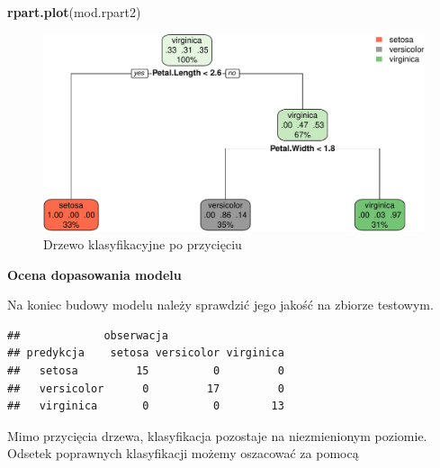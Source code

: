 \documentclass[
]{book}
\newenvironment{Shaded}{\begin{snugshade}}{\end{snugshade}}
\newcommand{\DataTypeTok}[1]{\textcolor[rgb]{0.13,0.29,0.53}{#1}}
\newcommand{\KeywordTok}[1]{\textcolor[rgb]{0.13,0.29,0.53}{\textbf{#1}}}
\newcommand{\NormalTok}[1]{#1}
\newcommand{\OperatorTok}[1]{\textcolor[rgb]{0.81,0.36,0.00}{\textbf{#1}}}
\newcommand{\StringTok}[1]{\textcolor[rgb]{0.31,0.60,0.02}{#1}}
\theoremstyle{plain}
\theoremstyle{definition}
\theoremstyle{definition}
\theoremstyle{definition}
\theoremstyle{definition}
\theoremstyle{remark}
\begin{document}
\begin{Shaded}
\begin{Highlighting}[]
\KeywordTok{rpart.plot}\NormalTok{(mod.rpart2)}
\end{Highlighting}
\end{Shaded}

\begin{figure}
\centering
\includegraphics{EksploracjaDanych_files/figure-latex/unnamed-chunk-18-1.pdf}
\caption{\label{fig:unnamed-chunk-18}Drzewo klasyfikacyjne po przycięciu}
\end{figure}

\textbf{Ocena dopasowania modelu}

Na koniec budowy modelu należy sprawdzić jego jakość na zbiorze testowym.

\begin{Shaded}
\end{Shaded}

\begin{verbatim}
##             obserwacja
## predykcja    setosa versicolor virginica
##   setosa         15          0         0
##   versicolor      0         17         0
##   virginica       0          0        13
\end{verbatim}

Mimo przycięcia drzewa, klasyfikacja pozostaje na niezmienionym poziomie. Odsetek poprawnych klasyfikacji możemy oszacować za pomocą
\end{document}

